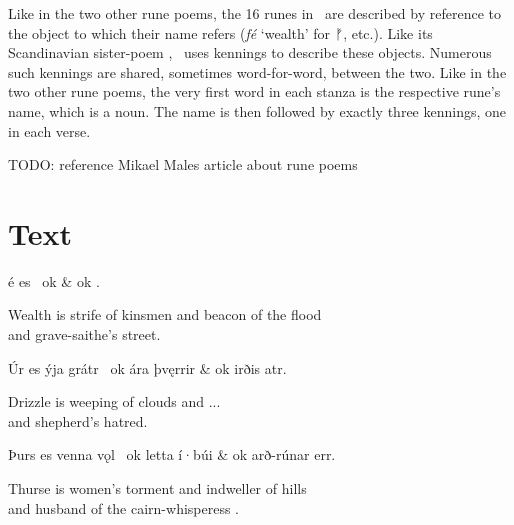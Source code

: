 Like in the two other rune poems, the 16 runes in \IcelandicRunePoem\ are described by reference to the object to which their name refers (\emph{fé} ‘wealth’ for ᚠ, etc.).  Like its Scandinavian sister-poem , \IcelandicRunePoem\ uses kennings to describe these objects.  Numerous such kennings are shared, sometimes word-for-word, between the two.
Like in the two other rune poems, the very first word in each stanza is the respective rune’s name, which is a noun.  The name is then followed by exactly three kennings, one in each verse.


TODO: reference Mikael Males article about rune poems


\sectionline

\section{Text}

\bvg\bva%
é es  \hld\ ok  &
\ind ok .\eva

\bvb Wealth is strife of kinsmen and beacon of the flood \\
\ind and grave-saithe’s  street.\evb\evg


\bvg\bva%
Úr es ýja grátr \hld\ ok ára þvęrrir &
\ind ok irðis atr.\eva

\bvb Drizzle is weeping of clouds and ... \\
\ind and shepherd’s hatred.\evb\evg


\bvg\bva%
Þurs es venna vǫl \hld\ ok letta í·búi &
\ind ok arð-rúnar err.\eva

\bvb Thurse is women’s torment and indweller of hills \\
\ind and husband of the cairn-whisperess .\evb\evg



